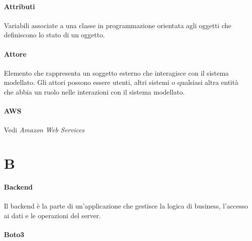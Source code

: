 \documentclass[10pt, a4paper]{article}
\begin{document}
\vspace{2em}
\paragraph{Attributi}\noindent\hrulefill
\paragraph{}Variabili associate a una classe in programmazione orientata agli oggetti che definiscono lo stato di un oggetto.


\vspace{2em}
\paragraph{Attore}\noindent\hrulefill
\paragraph{}Elemento che rappresenta un soggetto esterno che interagisce con il sistema modellato. Gli attori possono essere utenti, altri sistemi o qualsiasi altra entità che abbia un ruolo nelle interazioni con il sistema modellato.

\vspace{2em}
\paragraph{AWS}\noindent\hrulefill
\paragraph{}Vedi \textit{Amazon Web Services\pg}


\newpage
\section{B}
\vspace{2em}
\paragraph{Backend}\noindent\hrulefill
\paragraph{}Il backend è la parte di un'applicazione che gestisce la logica di business, l'accesso ai dati e le operazioni del server.

\vspace{2em}
\paragraph{Boto3}\noindent\hrulefill
\end{document}
